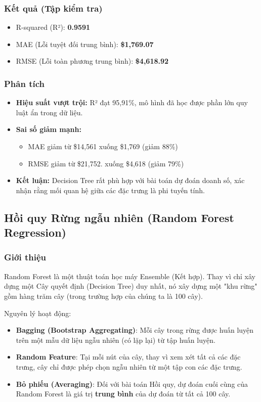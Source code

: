 \subsubsection{Kết quả (Tập kiểm tra)}
\begin{itemize}
    \item R-squared (R²): \textbf{0.9591}
    \item MAE (Lỗi tuyệt đối trung bình): \textbf{\$1,769.07}
    \item RMSE (Lỗi toàn phương trung bình): \textbf{\$4,618.92}
\end{itemize}

\subsubsection{Phân tích}
\begin{itemize}
    \item \textbf{Hiệu suất vượt trội:} R² đạt 95,91\%, mô hình đã học được phần lớn quy luật ẩn trong dữ liệu.
    \item \textbf{Sai số giảm mạnh:} 
    \begin{itemize}
        \item MAE giảm từ \$14,561 xuống \$1,769 (giảm 88\%)
        \item RMSE giảm từ \$21,752. xuống \$4,618 (giảm 79\%)
    \end{itemize}
    \item \textbf{Kết luận:} Decision Tree rất phù hợp với bài toán dự đoán doanh số, xác nhận rằng mối quan hệ giữa các đặc trưng là phi tuyến tính.
\end{itemize}

\subsection{Hồi quy Rừng ngẫu nhiên (Random Forest Regression)}

\subsubsection{Giới thiệu}
Random Forest là một thuật toán học máy Ensemble (Kết hợp). Thay vì chỉ xây dựng một Cây quyết định (Decision Tree) duy nhất, nó xây dựng một "khu rừng" gồm hàng trăm cây (trong trường hợp của chúng ta là 100 cây).

Nguyên lý hoạt động:

\begin{itemize}
    \item \textbf{Bagging (Bootstrap Aggregating)}: Mỗi cây trong rừng được huấn luyện trên một mẫu dữ liệu ngẫu nhiên (có lặp lại) từ tập huấn luyện.

    \item \textbf{Random Feature}: Tại mỗi nút của cây, thay vì xem xét tất cả các đặc trưng, cây chỉ được phép chọn ngẫu nhiên từ một tập con các đặc trưng.
    
    \item \textbf{Bỏ phiếu (Averaging)}: Đối với bài toán Hồi quy, dự đoán cuối cùng của Random Forest là giá trị \textbf{trung bình} của dự đoán từ tất cả 100 cây.
\end{itemize}

